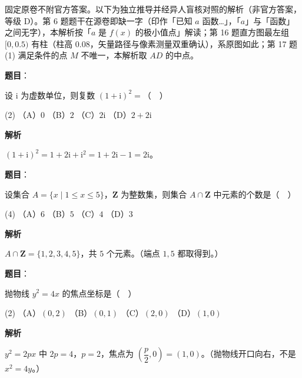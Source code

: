 

\begin{gktip}
固定原卷不附官方答案。以下为独立推导并经异人盲核对照的解析（非官方答案，等级 D）。第 6 题题干在源卷即缺一字（印作「已知 \(a\) 函数…」，「\(a\)」与「函数」之间无字），本解析按「\(a\) 是 \(f(x)\) 的极小值点」解读；第 16 题直方图最左组 \([0,0.5)\) 有柱（柱高 \(0.08\)，矢量路径与像素测量双重确认），系原图如此；第 17 题 (1) 满足条件的点 \(M\) 不唯一，本解析取 \(AD\) 的中点。
\end{gktip}

\begin{answer}

\textbf{题目}：

设 \(\mathrm{i}\) 为虚数单位，则复数 \((1+\mathrm{i})^{2}=\)（　）

\begin{gkopts}(2)
\task （A）\(0\)
\task （B）\(2\)
\task （C）\(2\mathrm{i}\)
\task （D）\(2+2\mathrm{i}\)
\end{gkopts}

\textbf{解析}

\((1+\mathrm{i})^{2}=1+2\mathrm{i}+\mathrm{i}^{2}=1+2\mathrm{i}-1=2\mathrm{i}\)。


\end{answer}
\begin{answer}

\textbf{题目}：

设集合 \(A=\{x\mid 1\leqslant x\leqslant 5\}\)，\(\mathbf{Z}\) 为整数集，则集合 \(A\cap\mathbf{Z}\) 中元素的个数是（　）

\begin{gkopts}(4)
\task （A）\(6\)
\task （B）\(5\)
\task （C）\(4\)
\task （D）\(3\)
\end{gkopts}

\textbf{解析}

\(A\cap\mathbf{Z}=\{1,2,3,4,5\}\)，共 \(5\) 个元素。（端点 \(1,5\) 都取得到。）


\end{answer}
\begin{answer}

\textbf{题目}：

抛物线 \(y^{2}=4x\) 的焦点坐标是（　）

\begin{gkopts}(2)
\task （A）\((0,2)\)
\task （B）\((0,1)\)
\task （C）\((2,0)\)
\task （D）\((1,0)\)
\end{gkopts}

\textbf{解析}

\(y^{2}=2px\) 中 \(2p=4\)，\(p=2\)，焦点为 \(\left(\dfrac{p}{2},0\right)=(1,0)\)。（抛物线开口向右，不是 \(x^{2}=4y\)。）


\end{answer}
